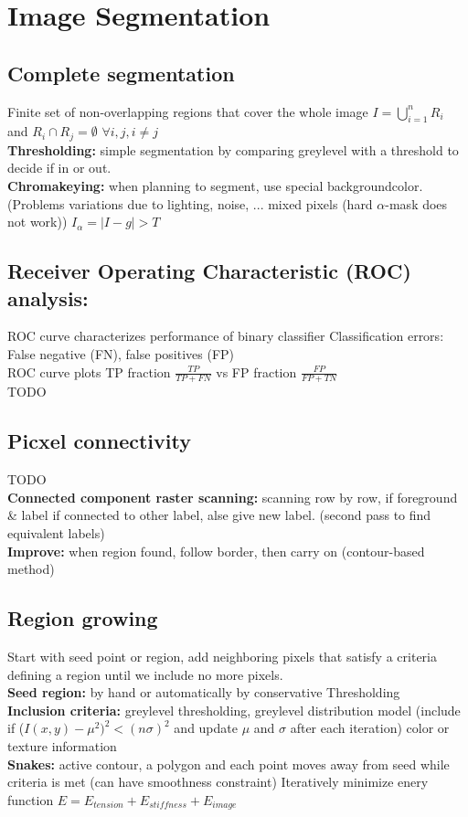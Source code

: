 \section*{Image Segmentation}
\subsection*{Complete segmentation}
Finite set of non-overlapping regions that cover the whole image $I = \bigcup_{i = 1}^{n} R_i$ and $R_i \cap R_j = \emptyset$ $\forall i, j, i \neq j$\\
\textbf{Thresholding:} simple segmentation by comparing greylevel with a threshold to decide if in or out.\\
\textbf{Chromakeying:} when planning to segment, use special backgroundcolor. (Problems variations due to lighting, noise, ... mixed pixels (hard $\alpha$-mask does not work)) $I_\alpha = |I - g| > T$
\subsection*{Receiver Operating Characteristic (ROC) analysis:}
ROC curve characterizes performance of binary classifier Classification errors: False negative (FN), false positives (FP)\\
ROC curve plots TP fraction $\frac{TP}{TP + FN}$ vs FP fraction $\frac{FP}{FP + TN}$\\
TODO\\
\subsection*{Picxel connectivity}
TODO\\
\textbf{Connected component raster scanning:} scanning row by row, if foreground \& label if connected to other label, alse give new label. (second pass to find equivalent labels)\\
\textbf{Improve:} when region found, follow border, then carry on (contour-based method)
\subsection*{Region growing}
Start with seed point or region, add neighboring pixels that satisfy a criteria defining a region until we include no more pixels.\\
\textbf{Seed region:} by hand or automatically by conservative Thresholding\\
\textbf{Inclusion criteria:} greylevel thresholding, greylevel distribution model (include if ($I(x, y) - \mu^{2})^{2} < (n \sigma)^{2}$ and update $\mu$ and $\sigma$ after each iteration) color or texture information\\
\textbf{Snakes:} active contour, a polygon and each point moves away from seed while criteria is met (can have smoothness constraint) Iteratively minimize enery function $E = E_{tension} + E_{stiffness} + E_{image}$
